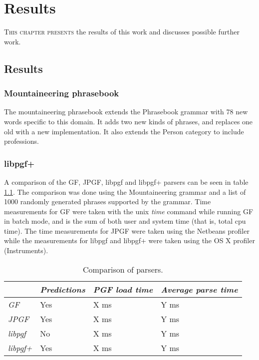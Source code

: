 \chapter{Results}
\lettrine[lines=4, loversize=-0.1, lraise=0.1]{T}{his chapter presents} the results of this work and discusses possible further work.


\section{Results}


\subsection{Mountaineering phrasebook}
The mountaineering phrasebook extends the Phrasebook grammar with 78 new words specific to this domain. It adds two new kinds of phrases, and replaces one old with a new implementation. It also extends the Person category to include professions.


\subsection{libpgf+}
A comparison of the GF, JPGF, libpgf and libpgf+ parsers can be seen in table \ref{tbl:parsercomparison}. The comparison was done using the Mountaineering grammar and a list of 1000 randomly generated phrases supported by the grammar. Time measurements for GF were taken with the unix \emph{time} command while running GF in batch mode, and is the sum of both user and system time (that is, total cpu time). The time measurements for JPGF were taken using the Netbeans profiler while the measurements for libpgf and libpgf+ were taken using the OS X profiler (Instruments).

\begin{table}
\begin{center}
\begin{tabular}{|l|l|l|l|}
	\hline
	 & \emph{Predictions} & \emph{PGF load time} & \emph{Average parse time} \\ \hline
	\emph{GF} & Yes & X ms & Y ms \\ \hline
	\emph{JPGF} & Yes & X ms & Y ms \\ \hline
	\emph{libpgf} & No & X ms & Y ms \\ \hline
	\emph{libpgf+} & Yes & X ms & Y ms \\ \hline
\end{tabular}
\end{center}
\caption{Comparison of parsers.}
\label{tbl:parsercomparison}
\end{table}


